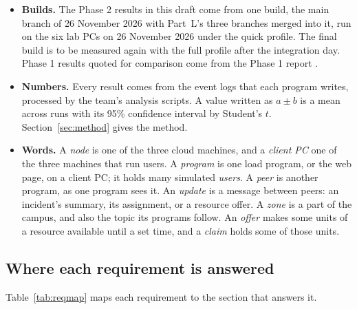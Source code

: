 \begin{itemize}
  \item \textbf{Builds.} The Phase 2 results in this draft come from one build, the main branch of 26 November 2026 with Part~L's three branches merged into it, run on the six lab PCs on 26 November 2026 under the quick profile. The final build is to be measured again with the full profile after the integration day. Phase 1 results quoted for comparison come from the Phase 1 report \cite{phase1}.
  \item \textbf{Numbers.} Every result comes from the event logs that each program writes, processed by the team's analysis scripts. A value written as $a \pm b$ is a mean across runs with its 95\% confidence interval by Student's $t$. Section~\ref{sec:method} gives the method.
  \item \textbf{Words.} A \emph{node} is one of the three cloud machines, and a \emph{client PC} one of the three machines that run users. A \emph{program} is one load program, or the web page, on a client PC; it holds many simulated \emph{users}. A \emph{peer} is another program, as one program sees it. An \emph{update} is a message between peers: an incident's summary, its assignment, or a resource offer. A \emph{zone} is a part of the campus, and also the topic its programs follow. An \emph{offer} makes some units of a resource available until a set time, and a \emph{claim} holds some of those units.
\end{itemize}

\subsection{Where each requirement is answered}

Table~\ref{tab:reqmap} maps each requirement to the section that answers it.

